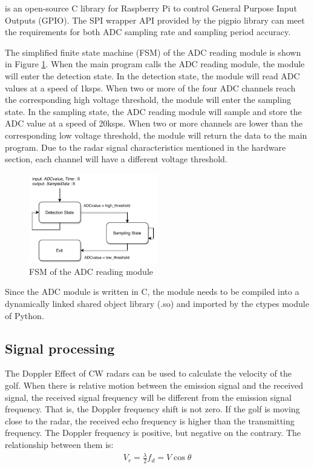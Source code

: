 \textcite{pigiop} is an open-source C library for Raspberry Pi to control General Purpose Input Outputs (GPIO). The SPI wrapper API provided by the pigpio library can meet the requirements for both ADC sampling rate and sampling period accuracy.
\par
The simplified finite state machine (FSM) of the ADC reading module is shown in Figure \ref{fig:adc_module}. When the main program calls the ADC reading module, the module will enter the detection state. In the detection state, the module will read ADC values at a speed of 1ksps. When two or more of the four ADC channels reach the corresponding high voltage threshold, the module will enter the sampling state. In the sampling state, the ADC reading module will sample and store the ADC value at a speed of 20ksps. When two or more channels are lower than the corresponding low voltage threshold, the module will return the data to the main program. Due to the radar signal characteristics mentioned in the hardware section, each channel will have a different voltage threshold.
\begin{figure}[H]
    \centering
    \includegraphics[width=0.5\textwidth]{figure/SPI.pdf}
    \caption{FSM of the ADC reading module}
    \label{fig:adc_module}
\end{figure}
Since the ADC module is written in C, the module needs to be compiled into a dynamically linked shared object library (.so) and imported by the ctypes module of Python.



\subsection{Signal processing}
The Doppler Effect of CW radars can be used to calculate the velocity of the golf. When there is relative motion between the emission signal and the received signal, the received signal frequency will be different from the emission signal frequency. That is, the Doppler frequency shift is not zero. If the golf is moving close to the radar, the received echo frequency is higher than the transmitting frequency. The Doppler frequency is positive, but negative on the contrary. The relationship between them is: 
\begin{align}
V_{r}=\frac{\lambda}{2} f_{d}=V \cos \theta
\end{align}

